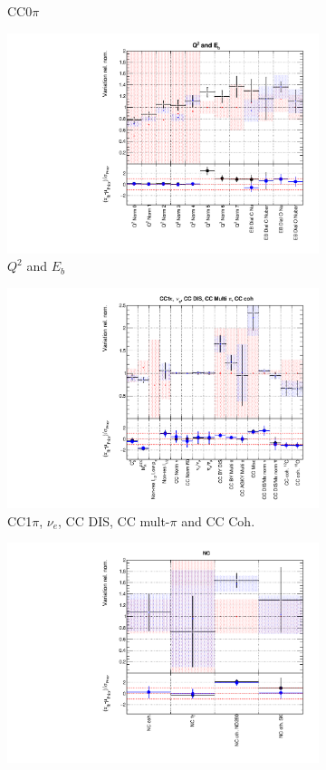 \begin{figure}
\begin{subfigure}{0.49\textwidth}
  \caption{CC0$\pi$}
\end{subfigure}
\begin{subfigure}{0.49\textwidth}
  \centering
  \includegraphics[width=0.9\linewidth]{figs/comp5q2vs8q2xsec2}
  \caption{$Q^2$ and $E_b$}
\end{subfigure}
\begin{subfigure}{0.49\textwidth}
  \centering
  \includegraphics[width=0.9\linewidth]{figs/comp5q2vs8q2xsec3}
  \caption{CC1$\pi$, $\nu_e$, CC DIS, CC mult-$\pi$ and CC Coh.}
\end{subfigure}
\begin{subfigure}{0.49\textwidth}
  \centering
  \includegraphics[width=0.9\linewidth]{figs/comp5q2vs8q2xsec4}

\end{subfigure}
\end{figure}
